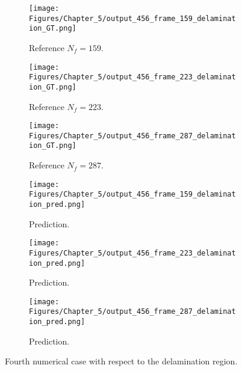 \begin{figure} [!ht]
	\centering
	\begin{subfigure}[b]{.32\textwidth}
		\centering
		\texttt{[image: Figures/Chapter\_5/output\_456\_frame\_159\_delamination\_GT.png]}
		\caption{Reference $N_f=159$.}
		\label{fig:ref_456_damage_159}
	\end{subfigure}
	\begin{subfigure}[b]{.32\textwidth}
		\centering
		\texttt{[image: Figures/Chapter\_5/output\_456\_frame\_223\_delamination\_GT.png]}
		\caption{Reference $N_f=223$.}
		\label{fig:ref_456_damage_223}
	\end{subfigure}
	\begin{subfigure}[b]{.32\textwidth}
		\centering
		\texttt{[image: Figures/Chapter\_5/output\_456\_frame\_287\_delamination\_GT.png]}
		\caption{Reference $N_f=287$.}
		\label{fig:ref_456_damage_287}	
	\end{subfigure}
	\begin{subfigure}[b]{.32\textwidth}
		\centering
		\texttt{[image: Figures/Chapter\_5/output\_456\_frame\_159\_delamination\_pred.png]}
		\caption{Prediction.}
		\label{fig:pred_456_damage_159}
	\end{subfigure}
	\begin{subfigure}[b]{.32\textwidth}
		\centering
		\texttt{[image: Figures/Chapter\_5/output\_456\_frame\_223\_delamination\_pred.png]}
		\caption{Prediction.}
		\label{fig:pred_456_damage_223}
	\end{subfigure}
	\begin{subfigure}[b]{.32\textwidth}
		\centering
		\texttt{[image: Figures/Chapter\_5/output\_456\_frame\_287\_delamination\_pred.png]}
		\caption{Prediction.}
		\label{fig:pred_456_damage_287}	
	\end{subfigure}
	\caption{Fourth numerical case with respect to the delamination region.}
	\label{fig:num_results_CS_damage_area_456}
\end{figure}


